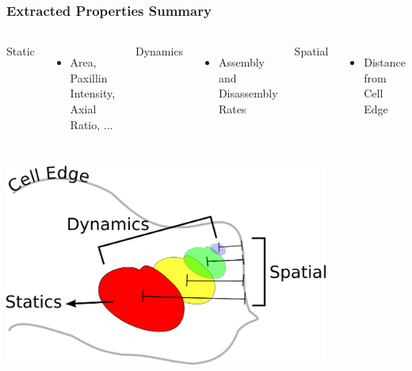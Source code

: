 \documentclass{beamer}
\begin{document}
\begin{frame}
	\frametitle{Extracted Properties Summary}
	\begin{columns}
	Static
		\begin{itemize}
		\item Area, Paxillin Intensity, Axial Ratio, ...
		\end{itemize}
	Dynamics
		\begin{itemize}
		\item Assembly and Disassembly Rates
		\end{itemize}
	Spatial
		\begin{itemize}
		\item Distance from Cell Edge
		\end{itemize}
	\end{columns}
	\begin{center}
	\includegraphics[width=0.8\textwidth]{figures/analysis/property_cartoon}
	\end{center}
\end{frame}
\end{document}
